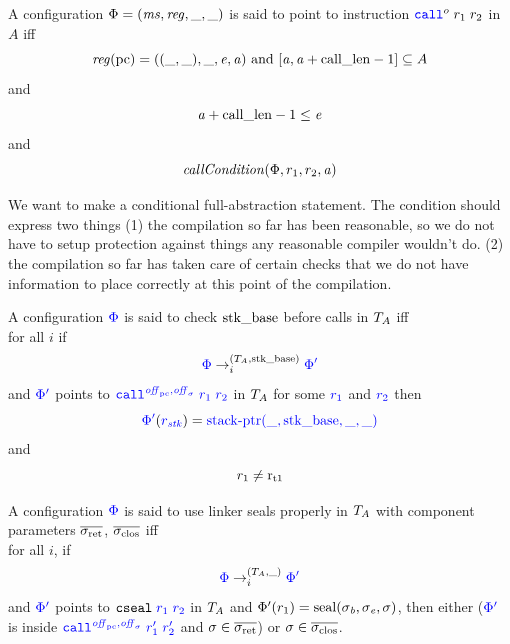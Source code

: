 \documentclass[a4paper]{article}
\begin{document}
\begin{definition}
  \label{def:points-to-call}
  A configuration {\sourcecolor $\Phi = (\ms,\reg,\_,\_)$} is said to point to instruction $\scall{o}{r_1}{r_2}$ in $A$ iff
  \[
    \reg(\pcreg) = ((\_,\_),\_,\eaddr,\aaddr) \tand [\aaddr,\aaddr+\calllen-1] \subseteq A
  \]
and
\[
  \aaddr+\calllen - 1 \leq \eaddr
\]
and
\[
  \callCond{\Phi,r_1,r_2,\aaddr}
\]
\end{definition}
We want to make a conditional full-abstraction statement. The condition should express two things (1) the compilation so far has been reasonable, so we do not have to setup protection against things any reasonable compiler wouldn't do. (2) the compilation so far has taken care of certain checks that we do not have information to place correctly at this point of the compilation.
\begin{definition}
  \label{def:check-stack-addr-before-call}
  A configuration $\src{\Phi}$ is said to check $\stkb$ before calls in $\ta$ iff\\
  for all $i$ if
  \[
    \src{\Phi} \nstep[i]{(\ta,\stkb)} \src{\Phi'}
  \]
  and $\src{\Phi'}$ points to $\src{\scall{\offpc,\offsigma}{r_1}{r_2}}$ in $\ta$ for some $\src{r_1}$ and $\src{r_2}$
  then
  \[
    \src{\Phi'}(\src{r_\stk}) = \src{\stkptr{\_,\stkb,\_,\_}}
  \]
  and
  \[
    r_1 \neq \rtmp{1}
  \]
\end{definition}

\begin{definition}
  \label{def:use-return-seals-call}
  A configuration $\src{\Phi}$ is said to use linker seals properly in $\ta$ with component parameters $\sigrets$, $\sigcloss$ iff\\
  for all $i$, if
  \[
    \src{\Phi} \nstep[i]{(\ta,\_)} \src{\Phi'}
  \]
  and $\src{\Phi'}$ points to $\src{\tcseal{r_1}{r_2}}$ in $\ta$ and $\Phi'(r_1) = \seal{\sigma_\baddr,\sigma_\eaddr,\sigma}$, then either ($\src{\Phi'}$ is inside $\src{\scall{\offpc,\offsigma}{r_1'}{r_2'}}$ and $\sigma \in \sigrets$) or $\sigma \in \sigcloss$.
\end{definition}
\end{document}
